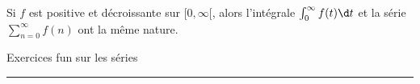 \Theoreme [$f:[0,\infty[\to\ob R$ continue par morceaux sur $[0,\infty[$]
Si $f$ est positive et d\'ecroissante sur $[0, \infty[$, alors l'int\'egrale $\int_0^\infty f(t)\d t$ 
et la s\'erie $\sum_{n=0}^\infty f(n)$ ont la m\^eme nature. 

\centerline{Exercices fun sur les s\'eries}
\hrule
\medskip\noindent
\bigskip
{}
\bigskip
{}
\vfill\null











\bye